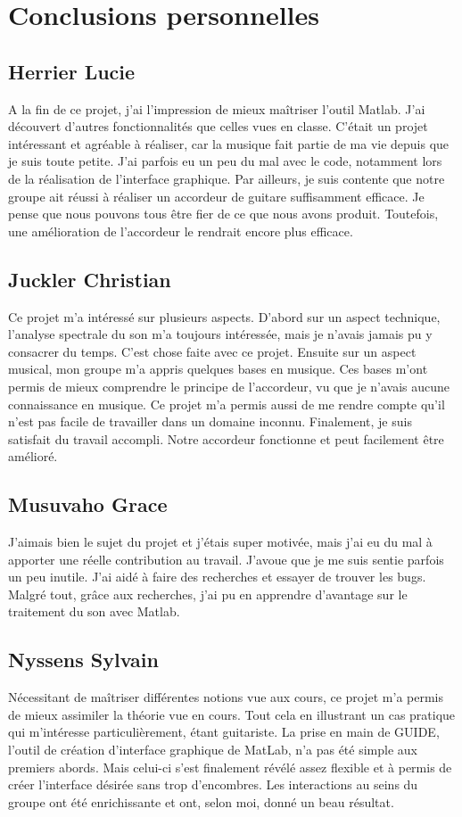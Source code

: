 \section{Conclusions personnelles}
\subsection{Herrier Lucie}
A la fin de ce projet, j'ai l'impression de mieux maîtriser l'outil Matlab. J'ai découvert d'autres fonctionnalités que celles vues en classe.  C'était un projet intéressant et agréable à réaliser, car la musique fait partie de ma vie depuis que je suis toute petite. J'ai parfois eu un peu du mal avec le code, notamment lors de la réalisation de l'interface graphique.
 Par ailleurs, je suis contente que notre groupe ait réussi à réaliser un accordeur de guitare suffisamment efficace. Je pense que nous pouvons tous être fier de ce que nous avons produit. Toutefois, une amélioration de l'accordeur le rendrait encore plus efficace.


\subsection{Juckler Christian}
Ce projet m'a intéressé sur plusieurs aspects. 
D'abord sur un aspect technique, l'analyse spectrale du son m'a toujours intéressée, mais je n'avais jamais pu y consacrer du temps. 
C'est chose faite avec ce projet.
Ensuite sur un aspect musical, mon groupe m'a appris quelques bases en musique.
Ces bases m'ont permis de mieux comprendre le principe de l'accordeur, vu que je n'avais aucune connaissance en musique.
Ce projet m'a permis aussi de me rendre compte qu'il n'est pas facile de travailler dans un domaine inconnu. 
Finalement, je suis satisfait du travail accompli. Notre accordeur fonctionne et peut facilement être amélioré.

\subsection{Musuvaho Grace}
J'aimais bien le sujet du projet et j'étais super motivée, mais j'ai eu du mal à apporter une réelle contribution au travail. J'avoue que je me suis sentie parfois un peu inutile. J'ai aidé à faire des recherches et essayer de trouver les bugs. Malgré tout, grâce aux recherches, j'ai pu en apprendre d'avantage sur le traitement du son avec Matlab.

\subsection{Nyssens Sylvain}
Nécessitant de maîtriser différentes notions vue aux cours, ce projet m'a permis de mieux assimiler la théorie vue en cours. Tout cela en illustrant un cas pratique qui m'intéresse particulièrement, étant guitariste. La prise en main de GUIDE, l'outil de création d'interface graphique de MatLab, n'a pas été simple aux premiers abords. Mais celui-ci s'est finalement révélé assez flexible et à permis de créer l'interface désirée sans trop d'encombres. Les interactions au seins du groupe ont été enrichissante et ont, selon moi, donné un beau résultat.
